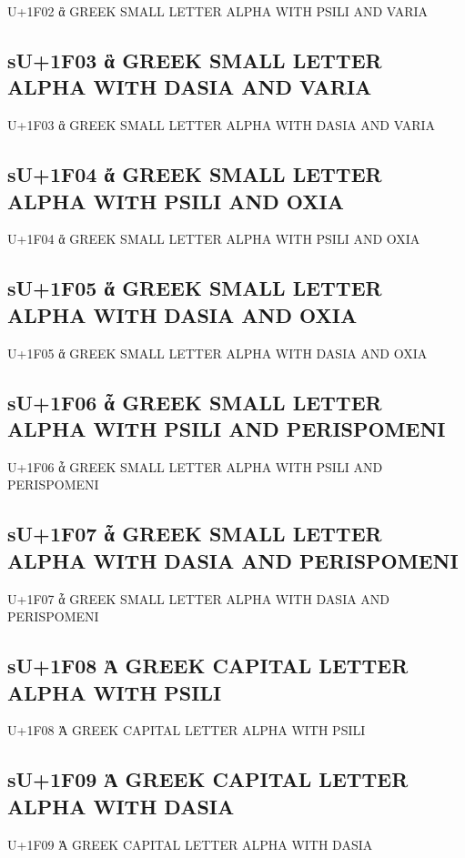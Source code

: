 U+1F02 ἂ GREEK SMALL LETTER ALPHA WITH PSILI AND VARIA

\subsection{sU+1F03 ἃ GREEK SMALL LETTER ALPHA WITH DASIA AND VARIA}

U+1F03 ἃ GREEK SMALL LETTER ALPHA WITH DASIA AND VARIA

\subsection{sU+1F04 ἄ GREEK SMALL LETTER ALPHA WITH PSILI AND OXIA}

U+1F04 ἄ GREEK SMALL LETTER ALPHA WITH PSILI AND OXIA

\subsection{sU+1F05 ἅ GREEK SMALL LETTER ALPHA WITH DASIA AND OXIA}

U+1F05 ἅ GREEK SMALL LETTER ALPHA WITH DASIA AND OXIA

\subsection{sU+1F06 ἆ GREEK SMALL LETTER ALPHA WITH PSILI AND PERISPOMENI}

U+1F06 ἆ GREEK SMALL LETTER ALPHA WITH PSILI AND PERISPOMENI

\subsection{sU+1F07 ἇ GREEK SMALL LETTER ALPHA WITH DASIA AND PERISPOMENI}

U+1F07 ἇ GREEK SMALL LETTER ALPHA WITH DASIA AND PERISPOMENI

\subsection{sU+1F08 Ἀ GREEK CAPITAL LETTER ALPHA WITH PSILI}

U+1F08 Ἀ GREEK CAPITAL LETTER ALPHA WITH PSILI

\subsection{sU+1F09 Ἁ GREEK CAPITAL LETTER ALPHA WITH DASIA}

U+1F09 Ἁ GREEK CAPITAL LETTER ALPHA WITH DASIA

